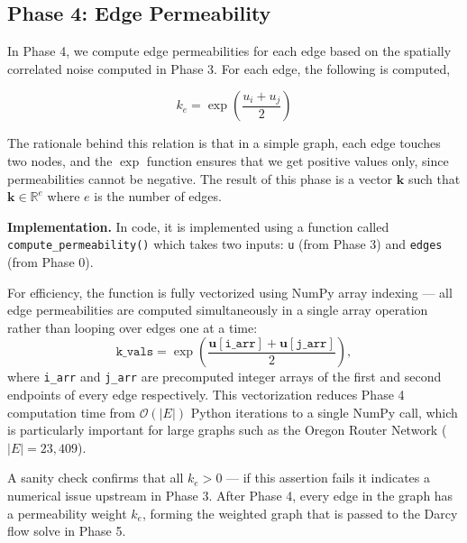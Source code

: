 \documentclass[a4paper,12pt]{amsart}
\numberwithin{equation}{section}
\def\bu{{\mathbf u}}
\begin{document}
\subsection{Phase 4: Edge Permeability}

In Phase 4, we compute edge permeabilities for each edge based on the 
spatially correlated noise computed in Phase 3. For each edge, the 
following is computed,

\begin{equation}
k_e = \exp\!\left(\frac{u_i + u_j}{2}\right)
\end{equation}

The rationale behind this relation is that in a simple graph, each 
edge touches two nodes, and the $\exp$ function ensures that we get 
positive values only, since permeabilities cannot be negative. The 
result of this phase is a vector $\mathbf{k}$ such that 
$\mathbf{k} \in \mathbb{R}^e$ where $e$ is the number of edges.

\textbf{Implementation.} In code, it is implemented using a function called 
\texttt{compute\_permeability()} which takes two inputs: 
\texttt{u} (from Phase 3) and \texttt{edges} (from Phase 0). 

For efficiency, the function is fully vectorized using NumPy array indexing 
— all edge permeabilities are computed simultaneously in a single array 
operation rather than looping over edges one at a time:
\begin{equation*}
\mathtt{k\_vals} = \exp\!\left(\frac{\bu[\mathtt{i\_arr}] + 
\bu[\mathtt{j\_arr}]}{2}\right),
\end{equation*}
where \texttt{i\_arr} and \texttt{j\_arr} are precomputed integer arrays 
of the first and second endpoints of every edge respectively. This 
vectorization reduces Phase 4 computation time from $\mathcal{O}(|E|)$ 
Python iterations to a single NumPy call, which is particularly important 
for large graphs such as the Oregon Router Network ($|E| = 23{,}409$).

A sanity check confirms that all $k_e > 0$ — if this assertion fails it 
indicates a numerical issue upstream in Phase 3. After Phase 4, every edge 
in the graph has a permeability weight $k_e$, forming the weighted graph 
that is passed to the Darcy flow solve in Phase 5.
\end{document}
